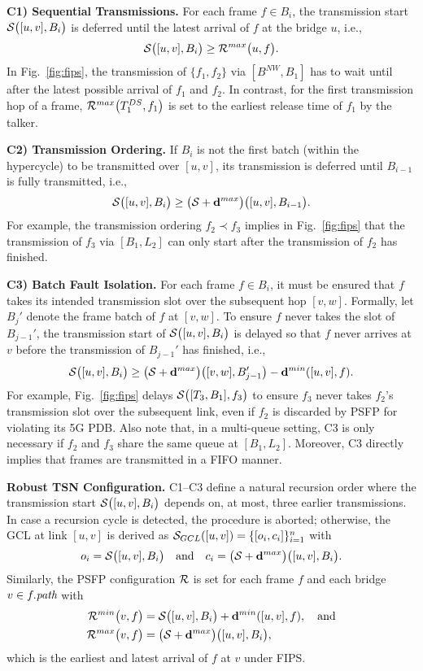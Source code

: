 

\textbf{C1) Sequential Transmissions.}
For each frame $f \in B_i$, the transmission start $\S{[u,v], B_i}$ is deferred until the latest arrival of $f$ at the bridge $u$, i.e.,
\begin{equation*}
  \S{[u,v], B_i} \geq \Rmax{u, f}.
\end{equation*}
In Fig.~\ref{fig:fips}, the transmission of $\{f_1, f_2\}$ via $[B^{NW}, B_1]$ has to wait until after the latest possible arrival of $f_1$ and $f_2$.
In contrast, for the first transmission hop of a frame, $\Rmax{T_1^{DS}, f_1}$ is set to the earliest release time of $f_1$ by the talker.

\textbf{C2) Transmission Ordering.}
If $B_i$ is not the first batch (within the hypercycle) to be transmitted over $[u,v]$, its transmission is deferred until $B_{i-1}$ is fully transmitted, i.e.,
\begin{equation*}
  \S{[u,v], B_i} \geq \add{\S}{\dpdbmax}{[u,v], B_{i-1}}.
\end{equation*}
For example, the transmission ordering $f_2 \prec f_3$ implies in Fig.~\ref{fig:fips} that the transmission of $f_3$ via $[B_1, L_2]$ can only start after the transmission of $f_2$ has finished.
 
\textbf{C3) Batch Fault Isolation.}
For each frame $f \in B_i$, it must be ensured that $f$ takes its intended transmission slot over the subsequent hop $[v,w]$.
Formally, let $B_j'$ denote the frame batch of $f$ at $[v,w]$.
To ensure $f$ never takes the slot of $B_{j-1}'$, the transmission start of $\S{[u,v], B_i}$ is delayed so that $f$ never arrives at $v$ before the transmission of $B_{j-1}'$ has finished, i.e.,
\begin{equation*}
  \S{[u,v], B_i} \geq \add{\S}{\dpdbmax}{[v,w], B_{j-1}'} - \dpdbmin{[u,v], f}.
\end{equation*}
For example, Fig.~\ref{fig:fips} delays $\S{[T_3, B_1], f_3}$ to ensure $f_3$ never takes $f_2$'s transmission slot over the subsequent link, even if $f_2$ is discarded by PSFP for violating its 5G PDB.
Also note that, in a multi-queue setting, C3 is only necessary if $f_2$ and $f_3$ share the same queue at $[B_1, L_2]$.
Moreover, C3 directly implies that frames are transmitted in a FIFO manner.
 
\textbf{Robust TSN Configuration.}
C1--C3 define a natural recursion order where the transmission start $\S{[u,v], B_i}$ depends on, at most, three earlier transmissions.
In case a recursion cycle is detected, the procedure is aborted;
otherwise, the GCL at link $[u,v]$ is derived as $\mathcal{S}_{GCL}([u,v]) = \{[o_i, c_i]\}_{i=1}^n$ with
\begin{equation*}
  o_i = \S{[u,v], B_i} \quad \text{and} \quad c_i = \add{\S}{\dpdbmax}{[u,v], B_i}.
\end{equation*}
Similarly, the PSFP configuration $\R{}$ is set for each frame $f$ and each bridge $v \in f.\textit{path}$ with
\begin{align*}
  \Rmin{v, f} &= \S{[u,v], B_i} + \dpdbmin{[u,v], f}, \quad \text{and} \\
  \Rmax{v, f} &= \add{\S}{\dpdbmax}{[u,v], B_i},
\end{align*}
which is the earliest and latest arrival of $f$ at $v$ under FIPS.

